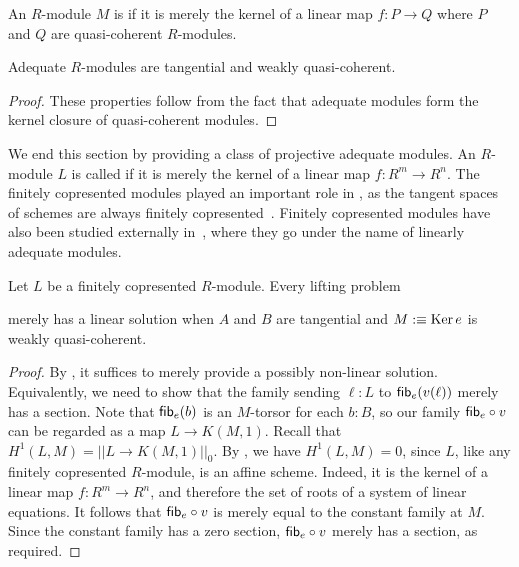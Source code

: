 \begin{definition}\label{def:adequate}
  An $R$-module $M$ is  if it is merely the kernel of a linear map $f : P \rightarrow Q$ where $P$ and $Q$ are quasi-coherent $R$-modules.
\end{definition}

\begin{proposition}\label{prp:tangential-wqc-adeq}
  Adequate $R$-modules are tangential and weakly quasi-coherent.
\end{proposition}

\begin{proof}
These properties follow from the fact that adequate modules form the
kernel closure of quasi-coherent modules.
\end{proof}

We end this section by providing a class of projective adequate modules.
An $R$-module $L$ is called  if it is merely the kernel of a linear map $f : R^m \rightarrow R^n$.
The finitely copresented modules played an important role in \cite{diffgeo-article}, as the tangent spaces of schemes are always finitely copresented~\cite[Lemma 2.2.8]{diffgeo-article}.
Finitely copresented modules have also been studied externally
in~\cite[\href{https://stacks.math.columbia.edu/tag/06Z1}{Tag 06Z1}]{stacks-project},
where they go under the name of linearly adequate modules.

\begin{lemma}\label{lem:lin-adeq-lift}
  Let $L$ be a finitely copresented $R$-module.
  Every lifting problem
  \begin{center}
  \end{center}
  merely has a linear solution when $A$ and $B$ are tangential and $M :\equiv \operatorname{Ker} e$ is weakly quasi-coherent.
\end{lemma}

\begin{proof}
  By , it suffices to merely provide a possibly non-linear solution.
  Equivalently, we need to show that the family sending $\ell : L$ to $\mathsf{fib}_e(v(\ell))$ merely
  has a section.
  Note that $\mathsf{fib}_e(b)$ is an $M$-torsor for each $b : B$,
  so our family $\mathsf{fib}_e \circ v$ can be regarded as a map $L \to K(M,1)$.
  Recall that $H^1(L,M)=||L \to K(M,1)||_0$.
  By \cite[Theorem 7.3.6]{draft}, we have $H^1(L,M)=0$, since $L$, like any finitely copresented $R$-module, is an affine scheme. Indeed, it is the kernel of a linear map $f : R^m \to R^n$, and therefore the set of roots of a system of linear equations.
  It follows that $\mathsf{fib}_e \circ v$ is merely equal to the constant family at $M$.
  Since the constant family has a zero section, $\mathsf{fib}_e \circ v$ merely has a section,
  as required.
\end{proof}

